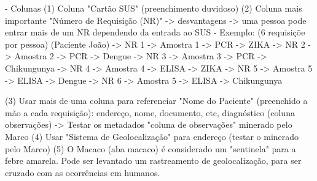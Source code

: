 - Colunas 
	(1) Coluna "Cartão SUS" (preenchimento duvidoso)
	(2) Coluna mais importante "Número de Requisição (NR)" -> desvantagens -> uma pessoa pode entrar mais de um NR dependendo da entrada ao SUS
		- Exemplo: (6 requisiçõe por pessoa)
				(Paciente João)	->	NR 1	->	Amostra 1 	->	PCR -> ZIKA
								->	NR 2	->	Amostra 2 	->	PCR -> Dengue
								->	NR 3	->	Amostra 3 	->	PCR -> Chikungunya
								->	NR 4	->	Amostra 4 	->	ELISA -> ZIKA
								->	NR 5	->	Amostra 5 	->	ELISA -> Dengue
								->	NR 6	->	Amostra 5 	->	ELISA -> Chikungunya

	(3) Usar mais de uma coluna para referenciar "Nome do Paciente" (preenchido a mão a cada requisição): endereço, nome, documento, etc, diagnóstico (coluna observações)
		-> Testar os metadados "coluna de observações" minerado pelo Marco
	(4) Usar "Sistema de Geolocalização" para endereço (testar o minerado pelo Marco)
	(5) O Macaco (aba macaco) é considerado um "sentinela" para a febre amarela. Pode ser levantado um rastreamento de geolocalização, para ser cruzado com as ocorrências em humanos.

